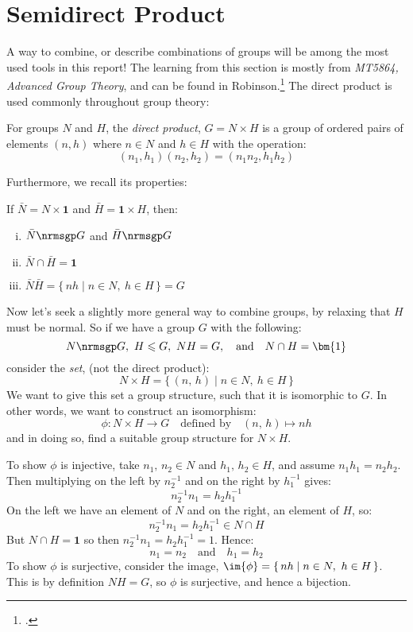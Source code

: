 \section{Semidirect Product}
A way to combine, or describe combinations of groups will be among the most used tools in this report!
The learning from this section is mostly from \textit{MT5864, Advanced Group Theory}, and can be found in
Robinson.\footcite{robinson1982}
The direct product is used commonly throughout group theory:
\begin{definition}
    \raggedright
    For groups \(N\) and \(H\), the \emph{direct product}, \(G = N\times H\) is a group of ordered pairs of elements
    \((n, h)\) where \(n \in N\) and \(h \in H\) with the operation:
    \[(n_1, h_1)(n_2, h_2) = (n_1n_2, h_1h_2)\]
\end{definition}

Furthermore, we recall its properties:
\begin{lemma}
    If \(\bar{N} = N \times \bm{1}\) and \(\bar{H} = \bm{1} \times H\), then:
    \begin{enumerate}[(i)]
        \item \(\bar{N} \nrmsgp G\) and \(\bar{H} \nrmsgp G\)
        \item \(\bar{N} \cap \bar{H} = \bm{1}\)
        \item \(\bar{N}\bar{H} = \{\,nh \mid n \in N,\ h \in H\,\} = G\)
    \end{enumerate}
\end{lemma}

Now let's seek a slightly more general way to combine groups, by relaxing that \(H\) must be normal.
So if we have a group \(G\) with the following:
\[N \nrmsgp G,\ H \leqslant G,\ NH = G, \quad \text{and} \quad N \cap H = \bm{1}\]
consider the \emph{set}, (not the direct product):
\[N \times H = \{\,(n,\,h) \mid n \in N,\ h \in H\,\}\]
We want to give this set a group structure, such that it is isomorphic to \(G\).
In other words, we want to construct an isomorphism:
\[\phi:N \times H \to G \quad \text{defined by} \quad (n,\, h) \mapsto nh\]
and in doing so, find a suitable group structure for \(N {\times} H\).

To show \(\phi\) is injective, take \(n_1,\, n_2 \in N\) and \(h_1,\, h_2 \in H\), and assume \(n_1 h_1 = n_2 h_2\).
Then multiplying on the left by \(n_2^{-1}\) and on the right by \(h_1^{-1}\) gives:
\[n_2^{-1} n_1 = h_2 h_1^{-1}\]
On the left we have an element of \(N\) and on the right, an element of \(H\), so:
\[n_2^{-1} n_1 = h_2 h_1^{-1} \in N \cap H\]
But \(N \cap H = \bm{1}\) so then \(n_2^{-1} n_1 = h_2 h_1^{-1} = 1\).
Hence:
\[n_1 = n_2 \quad \text{and} \quad h_1 = h_2\]
To show \(\phi\) is surjective, consider the image, \(\im{\phi} = \{\,nh \mid n \in N,\ h \in H\,\}\).
This is by definition \(NH = G\), so \(\phi\) is surjective, and hence a bijection.

